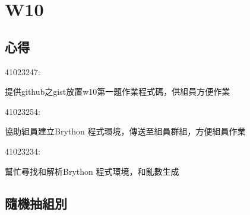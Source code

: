 \chapter{W10}
\section{心得}
41023247:

提供github之gist放置w10第一題作業程式碼，供組員方便作業

41023254:

協助組員建立Brython 程式環境，傳送至組員群組，方便組員作業

41023234:

幫忙尋找和解析Brython 程式環境，和亂數生成
\section{隨機抽組別}

